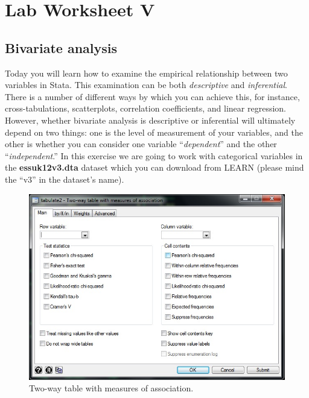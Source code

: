\documentclass{article}
\begin{document}
\pagestyle{fancy}
\fancyhf{}

\section*{\hfil Lab Worksheet V \hfil}
\subsection*{Bivariate analysis}

Today you will learn how to examine the empirical relationship between two variables in Stata. This examination can be both \textit{descriptive} and \textit{inferential}. There is a number of different ways by which you can achieve this, for instance, cross-tabulations, scatterplots, correlation coefficients, and linear regression. However, whether bivariate analysis is descriptive or inferential will ultimately depend on two things: one is the level of measurement of your variables, and the other is whether you can consider one variable ``\textit{dependent}'' and the other ``\textit{independent}.'' In this exercise we are going to work with categorical variables in the \textbf{essuk12v3.dta} dataset which you can download from LEARN (please mind the ``v3'' in the dataset's name).

\begin{figure}[H]
	\includegraphics[width=\linewidth]{../img/tabulate2.jpg}
	\caption{Two-way table with measures of association.}
\end{figure}
\end{document}
